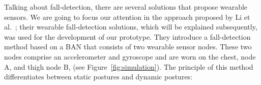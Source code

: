\documentclass[review]{elsarticle}
\begin{document}


Talking about fall-detection, there are several solutions that propose wearable sensors.
We are going to focus our attention in the approach proposed by Li et al.~\cite{Li2009}; their wearable fall-detection solutions,
which will be explained subsequently, was used for the development of our prototype. They introduce a fall-detection method based on a BAN that consists 
of two wearable sensor nodes. These two nodes comprise an accelerometer and gyroscope and are worn on the chest, node A, and thigh 
node B, (see Figure~\ref{fig:simulation}). The principle of this method differentiates between static postures and dynamic postures: 
\end{document}
